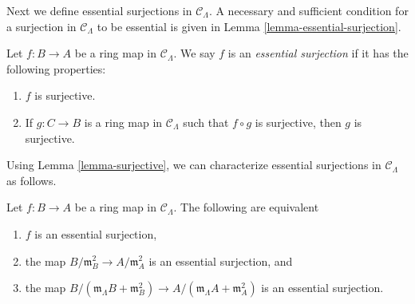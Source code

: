 \noindent
Next we define essential surjections in $\mathcal{C}_\Lambda$. A necessary 
and sufficient condition for a surjection in $\mathcal{C}_\Lambda$ to be 
essential is given in Lemma \ref{lemma-essential-surjection}.

\begin{definition}
\label{definition-essential-surjection}
Let $f: B \to A$ be a ring map in $\mathcal{C}_\Lambda$.  We say $f$ 
is an {\it essential surjection} if it has the following properties:
\begin{enumerate}
\item $f$ is surjective.
\item If $g: C \to B$ is a ring map in $\mathcal{C}_\Lambda$ such that 
$f \circ g$ is surjective, then $g$ is surjective.
\end{enumerate}
\end{definition}

\noindent
Using Lemma \ref{lemma-surjective}, we can characterize
essential surjections in $\mathcal{C}_\Lambda$ as follows.

\begin{lemma}
\label{lemma-essential-surjection-mod-squares}
Let $f: B \to A$ be a ring map in $\mathcal{C}_\Lambda$.
The following are equivalent
\begin{enumerate}
\item $f$ is an essential surjection,
\item the map $B/\mathfrak m_B^2 \to A/\mathfrak m_A^2$ is an essential
surjection, and
\item the map
$B/(\mathfrak m_\Lambda B + \mathfrak m_B^2) \to
A/(\mathfrak m_\Lambda A + \mathfrak m_A^2)$ is an essential surjection.
\end{enumerate}
\end{lemma}

